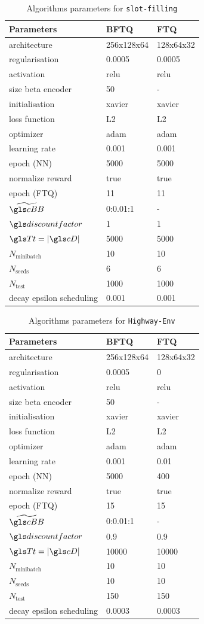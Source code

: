 \begin{table}[tp]
    \centering
    \begin{tabularx}{1.0\textwidth}{lll}
        \toprule
        Parameters & \gls{BFTQ} & \gls{FTQ}\tabularnewline
        \midrule
        architecture & 256x128x64 & 128x64x32\tabularnewline
        regularisation & 0.0005 & 0.0005\tabularnewline
        activation & relu & relu\tabularnewline
        size beta encoder & 50 & -\tabularnewline
        initialisation & xavier & xavier\tabularnewline
        loss function & L2 & L2\tabularnewline
        optimizer & adam & adam\tabularnewline
        learning rate & 0.001 & 0.001\tabularnewline
        epoch (\gls{NN}) & 5000 & 5000\tabularnewline
        normalize reward & true & true\tabularnewline
        epoch (\gls{FTQ}) & 11 & 11\tabularnewline
        $\tilde{\budgetspace}$ & 0:0.01:1 & -\tabularnewline
        $\discountfactor$ & 1 & 1\tabularnewline
        $\T=|\cD|$ & 5000 & 5000\tabularnewline
        $N_\text{minibatch}$ & 10 & 10\tabularnewline
        $N_\text{seeds}$ & 6 & 6\tabularnewline
        $N_\text{test}$ & 1000 & 1000\tabularnewline
        decay epsilon scheduling & 0.001 & 0.001\tabularnewline
        \bottomrule
    \end{tabularx}
    \caption{Algorithms parameters for \texttt{slot-filling}}
    \label{tab:param-algo-slot-filling}
\end{table}
\begin{table}[tp]
    \centering
    \begin{tabularx}{1.0\textwidth}{lll}
        \toprule
        Parameters & \gls{BFTQ} & \gls{FTQ}\tabularnewline
        \midrule
        architecture & 256x128x64 & 128x64x32\tabularnewline
        regularisation & 0.0005 & 0\tabularnewline
        activation & relu & relu\tabularnewline
        size beta encoder & 50 & -\tabularnewline
        initialisation & xavier & xavier\tabularnewline
        loss function & L2 & L2\tabularnewline
        optimizer & adam & adam\tabularnewline
        learning rate & 0.001 & 0.01\tabularnewline
        epoch (\gls{NN}) & 5000 & 400\tabularnewline
        normalize reward & true & true\tabularnewline
        epoch (\gls{FTQ}) & 15 & 15\tabularnewline
        $\tilde{\budgetspace}$ & 0:0.01:1 & -\tabularnewline
        $\discountfactor$ & 0.9 & 0.9\tabularnewline
        $\T=|\cD|$ & 10000 & 10000\tabularnewline
        $N_\text{minibatch}$ & 10 & 10\tabularnewline
        $N_\text{seeds}$ & 10 & 10\tabularnewline
        $N_\text{test}$ & 150 & 150\tabularnewline
        decay epsilon scheduling & 0.0003 & 0.0003\tabularnewline
        \bottomrule
    \end{tabularx}
    \caption{Algorithms parameters for \texttt{Highway-Env}}
    \label{tab:param-algo-highway-env}
\end{table}

